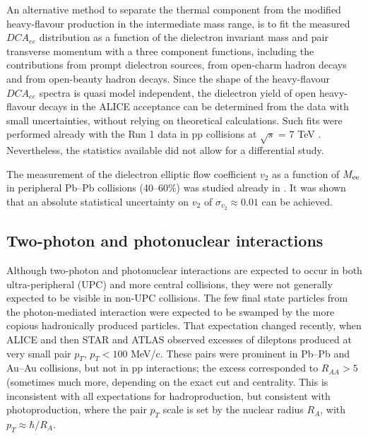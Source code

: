 \documentclass[../report.tex]{subfiles}
\begin{document}
An alternative method to separate the thermal component from the modified heavy-flavour production in the intermediate mass range, is to fit the measured $DCA_{ee}$ distribution as a function of the dielectron invariant mass and pair transverse momentum with a three component functions, including the contributions from prompt dielectron sources, from open-charm hadron decays and from open-beauty hadron decays. Since the shape of the heavy-flavour $DCA_{ee}$ spectra is quasi model independent, the dielectron yield of open heavy-flavour decays in the ALICE acceptance can be determined from the data with small uncertainties, without relying on theoretical calculations. Such fits were performed already with the Run 1 data in pp collisions at $\sqrt{s}$ = 7 TeV \cite{Acharya:2018ohw}. Nevertheless, the statistics available did not allow for a differential study.    

The measurement of the dielectron elliptic flow coefficient $v_{2}$ as a function of $M_{\rm ee}$ in peripheral Pb--Pb collisions (40--60\%) was studied already in \cite{Abelevetal:2014cna}. It was shown that an absolute statistical uncertainty on $v_{2}$ of $\sigma_{v_{2}} \approx 0.01$ can be achieved.

\newpage
\subsection{Two-photon and photonuclear interactions}
\label{sec:dileptons:peripheral}

Although two-photon and photonuclear interactions are expected to occur in both ultra-peripheral (UPC) and more central collisions, they were not generally expected to be visible in non-UPC collisions.  The few final state particles from the photon-mediated interaction were expected to be swamped by the more copious hadronically produced particles.   That expectation changed recently, when ALICE \cite{Adam:2015gba} and then STAR \cite{Adam:2018tdm,Zha:2018ohg} and ATLAS \cite{QM2018:presentation:AaronAngerami} observed excesses of dileptons produced at very small pair $p_T$, $p_T < 100$ MeV/c.   These pairs were prominent in Pb--Pb and Au--Au collisions, but not in pp interactions; the excess corresponded to $R_{AA} >5$ (sometimes much more, depending on the exact cut and centrality.  This is inconsistent with all expectations for hadroproduction, but  consistent with photoproduction, where the pair $p_T$ scale is set by the nuclear radius $R_A$, with $p_T \approx \hbar/R_A$. 
\end{document}
